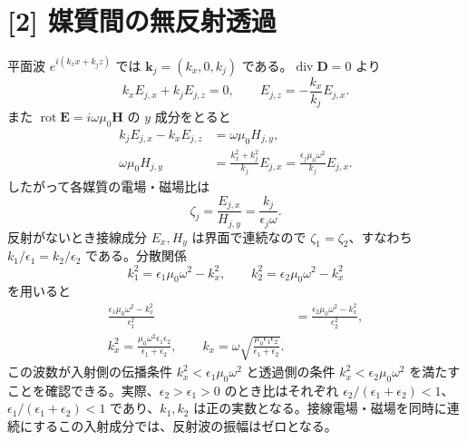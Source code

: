 \documentclass[11pt,a4paper]{article}
\begin{document}
\section*{[2] 媒質間の無反射透過}
平面波 $e^{i(k_xx+k_jz)}$ では $\boldsymbol k_j=(k_x,0,k_j)$ である。$\operatorname{div}\boldsymbol D=0$ より
\begin{equation}
  k_xE_{j,x}+k_jE_{j,z}=0,
  \qquad E_{j,z}=-\frac{k_x}{k_j}E_{j,x}.
\end{equation}
また $\operatorname{rot}\boldsymbol E=i\omega\mu_0\boldsymbol H$ の $y$ 成分をとると
\begin{align}
  k_jE_{j,x}-k_xE_{j,z}&=\omega\mu_0 H_{j,y},\\
  \omega\mu_0 H_{j,y}&=\frac{k_x^2+k_j^2}{k_j}E_{j,x}
   =\frac{\epsilon_j\mu_0\omega^2}{k_j}E_{j,x}.
\end{align}
したがって各媒質の電場・磁場比は
\begin{equation}
  \boxed{\zeta_j=\frac{E_{j,x}}{H_{j,y}}=\frac{k_j}{\epsilon_j\omega}}.
\end{equation}
反射がないとき接線成分 $E_x,H_y$ は界面で連続なので $\zeta_1=\zeta_2$、すなわち $k_1/\epsilon_1=k_2/\epsilon_2$ である。分散関係
\begin{equation}
  k_1^2=\epsilon_1\mu_0\omega^2-k_x^2,\qquad
  k_2^2=\epsilon_2\mu_0\omega^2-k_x^2
\end{equation}
を用いると
\begin{align}
  \frac{\epsilon_1\mu_0\omega^2-k_x^2}{\epsilon_1^2}
  &=\frac{\epsilon_2\mu_0\omega^2-k_x^2}{\epsilon_2^2},\\
  \boxed{k_x^2=\frac{\mu_0\omega^2\epsilon_1\epsilon_2}{\epsilon_1+\epsilon_2}},\qquad
  \boxed{k_x=\omega\sqrt{\frac{\mu_0\epsilon_1\epsilon_2}{\epsilon_1+\epsilon_2}}}.
\end{align}
この波数が入射側の伝播条件 $k_x^2<\epsilon_1\mu_0\omega^2$ と透過側の条件 $k_x^2<\epsilon_2\mu_0\omega^2$ を満たすことを確認できる。実際、$\epsilon_2>\epsilon_1>0$ のとき比はそれぞれ $\epsilon_2/(\epsilon_1+\epsilon_2)<1$、$\epsilon_1/(\epsilon_1+\epsilon_2)<1$ であり、$k_1,k_2$ は正の実数となる。接線電場・磁場を同時に連続にするこの入射成分では、反射波の振幅はゼロとなる。
\end{document}
